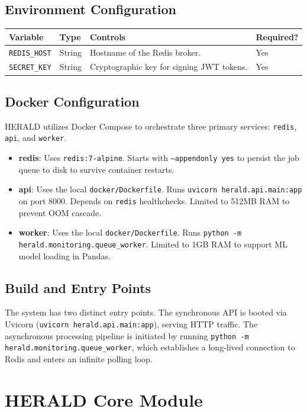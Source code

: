 \documentclass[12pt,a4paper]{report}
\begin{document}
\section{Environment Configuration}
\begin{longtable}{|p{3.5cm}|p{1.5cm}|p{5cm}|p{2cm}|}
\hline
\textbf{Variable} & \textbf{Type} & \textbf{Controls} & \textbf{Required?} \\
\hline
\endhead
\texttt{REDIS\_HOST} & String & Hostname of the Redis broker. & Yes \\
\texttt{SECRET\_KEY} & String & Cryptographic key for signing JWT tokens. & Yes \\
\hline
\end{longtable}

\section{Docker Configuration}
HERALD utilizes Docker Compose to orchestrate three primary services: \texttt{redis}, \texttt{api}, and \texttt{worker}. 
\begin{itemize}
\item \textbf{redis}: Uses \texttt{redis:7-alpine}. Starts with \texttt{--appendonly yes} to persist the job queue to disk to survive container restarts.
\item \textbf{api}: Uses the local \texttt{docker/Dockerfile}. Runs \texttt{uvicorn herald.api.main:app} on port 8000. Depends on \texttt{redis} healthchecks. Limited to 512MB RAM to prevent OOM cascade.
\item \textbf{worker}: Uses the local \texttt{docker/Dockerfile}. Runs \texttt{python -m herald.monitoring.queue\_worker}. Limited to 1GB RAM to support ML model loading in Pandas.
\end{itemize}

\section{Build and Entry Points}
The system has two distinct entry points. The synchronous API is booted via Uvicorn (\texttt{uvicorn herald.api.main:app}), serving HTTP traffic. The asynchronous processing pipeline is initiated by running \texttt{python -m herald.monitoring.queue\_worker}, which establishes a long-lived connection to Redis and enters an infinite polling loop.

\chapter{HERALD Core Module}
\end{document}
